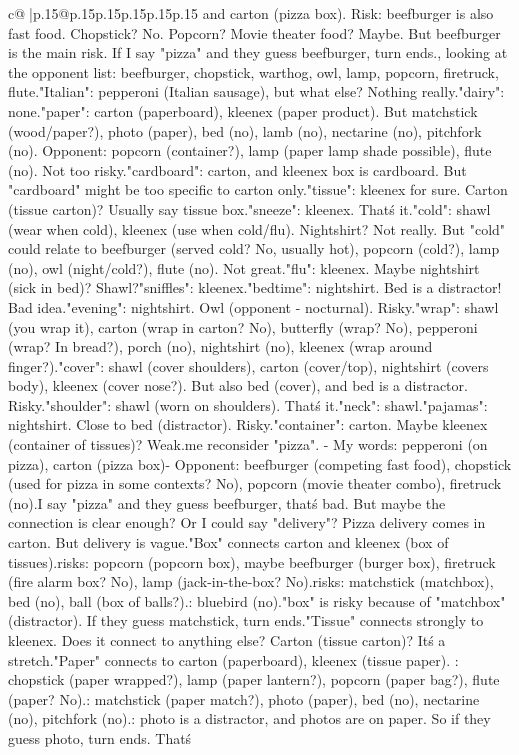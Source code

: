 \documentclass{article}
\begin{document}
{\begin{supertabular}{c@{$\;$}|p{.15\linewidth}@{}p{.15\linewidth}p{.15\linewidth}p{.15\linewidth}p{.15\linewidth}p{.15\linewidth}}
{{{and carton (pizza box). Risk: beefburger is also fast food. Chopstick? No. Popcorn? Movie theater food? Maybe. But beefburger is the main risk. If I say "pizza" and they guess beefburger, turn ends.\n\nActually, looking at the opponent list: beefburger, chopstick, warthog, owl, lamp, popcorn, firetruck, flute.\n\nClue "Italian": pepperoni (Italian sausage), but what else? Nothing really.\n\nClue "dairy": none.\n\nClue "paper": carton (paperboard), kleenex (paper product). But matchstick (wood/paper?), photo (paper), bed (no), lamb (no), nectarine (no), pitchfork (no). Opponent: popcorn (container?), lamp (paper lamp shade possible), flute (no). Not too risky.\n\nClue "cardboard": carton, and kleenex box is cardboard. But "cardboard" might be too specific to carton only.\n\nClue "tissue": kleenex for sure. Carton (tissue carton)? Usually say tissue box.\n\nClue "sneeze": kleenex. That\'s it.\n\nClue "cold": shawl (wear when cold), kleenex (use when cold/flu). Nightshirt? Not really. But "cold" could relate to beefburger (served cold? No, usually hot), popcorn (cold?), lamp (no), owl (night/cold?), flute (no). Not great.\n\nClue "flu": kleenex. Maybe nightshirt (sick in bed)? Shawl?\n\nClue "sniffles": kleenex.\n\nClue "bedtime": nightshirt. Bed is a distractor! Bad idea.\n\nClue "evening": nightshirt. Owl (opponent - nocturnal). Risky.\n\nClue "wrap": shawl (you wrap it), carton (wrap in carton? No), butterfly (wrap? No), pepperoni (wrap? In bread?), porch (no), nightshirt (no), kleenex (wrap around finger?).\n\nClue "cover": shawl (cover shoulders), carton (cover/top), nightshirt (covers body), kleenex (cover nose?). But also bed (cover), and bed is a distractor. Risky.\n\nClue "shoulder": shawl (worn on shoulders). That\'s it.\n\nClue "neck": shawl.\n\nClue "pajamas": nightshirt. Close to bed (distractor). Risky.\n\nClue "container": carton. Maybe kleenex (container of tissues)? Weak.\n\nLet me reconsider "pizza". \n- My words: pepperoni (on pizza), carton (pizza box)\n- Opponent: beefburger (competing fast food), chopstick (used for pizza in some contexts? No), popcorn (movie theater combo), firetruck (no).\nIf I say "pizza" and they guess beefburger, that\'s bad. But maybe the connection is clear enough? Or I could say "delivery"? Pizza delivery comes in carton. But delivery is vague.\n\n"Box" connects carton and kleenex (box of tissues).\nOpponent risks: popcorn (popcorn box), maybe beefburger (burger box), firetruck (fire alarm box? No), lamp (jack-in-the-box? No).\nDistractor risks: matchstick (matchbox), bed (no), ball (box of balls?).\nKill: bluebird (no).\nActually "box" is risky because of "matchbox" (distractor). If they guess matchstick, turn ends.\n\n"Tissue" connects strongly to kleenex. Does it connect to anything else? Carton (tissue carton)? It\'s a stretch.\n\n"Paper" connects to carton (paperboard), kleenex (tissue paper). \nOpponent: chopstick (paper wrapped?), lamp (paper lantern?), popcorn (paper bag?), flute (paper? No).\nDistractor: matchstick (paper match?), photo (paper), bed (no), nectarine (no), pitchfork (no).\nRisk: photo is a distractor, and photos are on paper. So if they guess photo, turn ends. That\'s }}}
\end{supertabular}}
\end{document}
